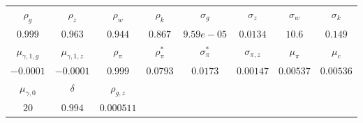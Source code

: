 \begin{tabular}{cccccccc} \\ \hline$\rho_g$&$\rho_z$&$\rho_w$&$\rho_k$&$\sigma_g$&$\sigma_z$&$\sigma_w$&$\sigma_k$\\$0.999$&$0.963$&$0.944$&$0.867$&$9.59e-05$&$0.0134$&$10.6$&$0.149$\\ \hline$\mu_{\gamma,1,g}$&$\mu_{\gamma,1,z}$&$\rho_\pi$&$\rho_{\pi}^*$&$\sigma_{\pi}^*$&$\sigma_{\pi,z}$&$\mu_\pi$&$\mu_c$\\$-0.0001$&$-0.0001$&$0.999$&$0.0793$&$0.0173$&$0.00147$&$0.00537$&$0.00536$\\ \hline$\mu_{\gamma,0}$&$\delta$&$\rho_{g,z}$\\$20$&$0.994$&$0.000511$\\ \hline \end{tabular}